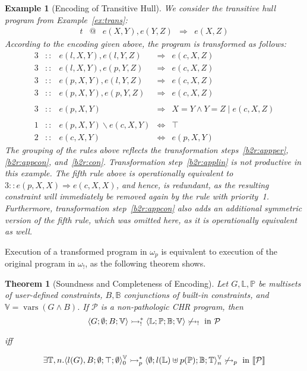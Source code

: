 \documentclass{tlp}
\newtheorem{theorem}{Theorem}
\newtheorem{example}{Example}[section]
\newcommand{\bL}{\ensuremath{\mathbb{L}}}
\newcommand{\mcP}{\ensuremath{\mathcal{P}}}
\newcommand{\bP}{\ensuremath{\mathbb{P}}}
\newcommand{\bbB}{\ensuremath{\mathbb{B}}}
\newcommand{\bbT}{\ensuremath{\mathbb{T}}}
\newcommand{\bbV}{\ensuremath{\mathbb{V}}}
\newcommand{\bang}{\ensuremath{!}}
\DeclareMathOperator{\vars}{vars}
\def\tuple#1{\langle #1 \rangle}
\newcommand{\stbang}[4]{\ensuremath{\tuple{#1; #2; #3; #4}}}
\newcommand{\tstate}[6]{\ensuremath{\tuple{#1; #2; #3; #4}_{#5}^{#6}}}
\newcommand{\obang}{\ensuremath{{\omega_\bang}}}
\newcommand{\der}{\ensuremath{\rightarrowtail}}
\newcommand{\derp}{\ensuremath{\der_p}}
\newcommand{\derbang}{\ensuremath{\der_{\bang}}}
\begin{document}
\begin{example}[Encoding of Transitive Hull] We consider the transitive hull
program from Example~\ref{ex:trans}:
 \[
\begin{array}{lclcl}
t & @ & e(X,Y), e(Y,Z) & \Longrightarrow & e(X,Z)
\end{array}
\]
According to the encoding given above, the program is transformed as follows:
\[
\begin{array}{ccrcl}
3 & :: & e(l,X,Y), e(l,Y,Z) & \Longrightarrow & e(c,X,Z) \\
3 & :: & e(l,X,Y), e(p,Y,Z) & \Longrightarrow & e(c,X,Z) \\
3 & :: & e(p,X,Y), e(l,Y,Z) & \Longrightarrow & e(c,X,Z) \\
3 & :: & e(p,X,Y), e(p,Y,Z) & \Longrightarrow & e(c,X,Z) \\
\\
3 & :: & e(p,X,Y) & \Longrightarrow & X=Y \wedge Y=Z \mid e(c,X,Z) \\
\\
1 & :: & e(p,X,Y) \backslash e(c,X,Y) & \Leftrightarrow & \top\\
2 & :: & e(c,X,Y) & \Leftrightarrow & e(p,X,Y)
\end{array}
\]
The grouping of the rules above reflects the transformation
steps~\ref{b2r:appper}, \ref{b2r:appcon}, and~\ref{b2r:con}. Transformation
step~\ref{b2r:applin} is not productive in this example. The fifth rule above is
operationally equivalent to $3 :: e(p,X,X) \Longrightarrow e(c,X,X)$, and hence,
is redundant, as the resulting constraint will immediately be removed again by
the rule with priority~1. Furthermore, transformation step~\ref{b2r:appcon} also
adds an additional symmetric version of the fifth rule, which was omitted here,
as it is operationally equivalent as well.
\end{example}

Execution of a transformed program in $\omega_p$ is equivalent to execution
of the original program in $\obang$, as the following theorem shows.

\begin{theorem}[Soundness and Completeness of Encoding]
  Let $G,\bL,\bP$ be multisets of  user-defined constraints, $B, \bbB$
  conjunctions of built-in constraints, and $\bbV = \vars(G \land B)$. If $\mcP$
  is a non-pathologic CHR program, then \[
 \stbang{G}{\emptyset}{B}{\bbV} \derbang^*
  	\stbang{\bL}{\bP}{\bbB}{\bbV} \not \derbang \textrm{ in $\mcP$}
  \] \centerline{iff} \[
 \exists \bbT,n. \tstate{l(G), B}{\emptyset}{\top}{\emptyset}{0}{\bbV} \derp^*
 \tstate{\emptyset}{l(\bL)\uplus p(\bP)}{\bbB}{\bbT}{n}{\bbV} \not \derp \textrm{ in $\llbracket\mcP\rrbracket$}
   \]
\end{theorem}
\end{document}
